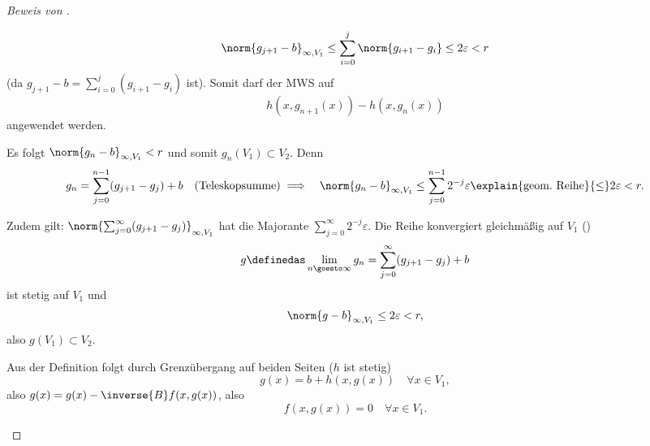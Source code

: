 \begin{proof}[Beweis von ]
\begin{proofenumerate}[label=\rechtsklammer{\arabic*}]
\begin{proofenumerate}[label=\rechtsklammer{\alph*}]
\begin{bemerkung*}
        \begin{equation*}
          \norm{g_{j+1}-b}_{\infty,V_1}\leq \sum_{i=0}^{j}\norm{g_{i+1}-g_i}\leq 2\varepsilon<r
        \end{equation*}
        (da \( g_{j+1}-b=\sum_{i=0}^{j}(g_{i+1}-g_i) \) ist). Somit darf der MWS auf
        \begin{equation*}
          h(x,g_{n+1}(x))-h(x,g_n(x))
        \end{equation*}
        angewendet werden.
      \end{bemerkung*}
      \item Es folgt \( \norm{g_n-b}_{\infty, V_1}<r \) und somit \( g_n(V_1)\subset V_2 \). Denn
      \begin{align*}
        &g_n=\sum_{j=0}^{n-1} (g_{j+1}-g_j)+b\quad (\text{Teleskopsumme})
        \implies &\norm{g_n-b}_{\infty,V_1}\leq \sum_{j=0}^{n-1}2^{-j}\varepsilon \explain{\text{geom.\ Reihe}}{\leq}2\varepsilon<r.
      \end{align*}
      \item Zudem gilt: \( \norm{\sum_{j=0}^{\infty}(g_{j+1}-g_j)}_{\infty,V_1} \) hat die Majorante \( \sum_{j=0}^{\infty}2^{-j}\varepsilon \). \timplies Die Reihe konvergiert gleichmäßig auf \( V_1 \) \timplies ()
      \begin{equation*}
        g\definedas \lim_{n \goesto \infty} g_n=\sum_{j=0}^{\infty}(g_{j+1}-g_j)+b
      \end{equation*}
      ist stetig auf \( V_1 \) und
      \begin{equation*}
        \norm{g-b}_{\infty,V_1}\leq 2\varepsilon<r,
      \end{equation*}
      also \( g(V_1)\subset V_2 \).
    \end{proofenumerate}
    Aus der Definition folgt durch Grenzübergang auf beiden Seiten (\( h \) ist stetig)
    \begin{equation*}
      g(x)=b+h(x,g(x))\quad \forall x\in V_1,
    \end{equation*}
    also \( g(x)=g(x)-\inverse{B}f(x,g(x)) \), also
    \begin{equation*}
      f(x,g(x))=0\quad \forall x\in V_1.
    \end{equation*}
  \end{proofenumerate}
\end{proof}

